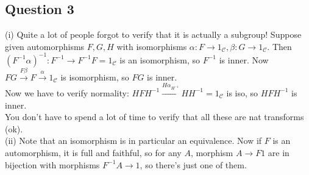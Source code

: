 \documentclass[a4paper]{article}
\begin{document}
\subsection{Question 3}
(i) Quite a lot of people forgot to verify that it is actually a subgroup! Suppose given automorphisms $F,G,H$ with isomorphisms $\alpha:F \to 1_{\mathcal{C}},\beta:G \to 1_{\mathcal{C}}$. Then $(F^{-1} \alpha)^{-1} : F^{-1} \to F^{-1}F = 1_{\mathcal{C}}$ is an isomorphism, so $F^{-1}$ is inner. Now $FG\xrightarrow{F\beta} F \xrightarrow{\alpha} 1_\mathcal{C}$ is isomorphism, so $FG$ is inner.\\
Now we have to verify normality: $HFH^{-1} \xrightarrow{H \alpha_{H^{-1}}} HH^{-1} = 1_{\mathcal{C}}$ is iso, so $HFH^{-1}$ is inner.\\
You don't have to spend a lot of time to verify that all these are nat transforms (ok).\\
(ii) Note that an isomorphism is in particular an equivalence. Now if $F$ is an automorphism, it is full and faithful, so for any $A$, morphism $A \to F1$ are in bijection with morphisms $F^{-1} A \to 1$, so there's just one of them.
\end{document}
